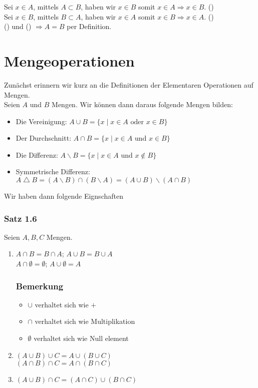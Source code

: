 Sei $x\in A$, mittels $A\subset B$, haben wir $x\in B$ somit $x\in A \Rightarrow x\in B$. (\textasteriskcentered)\\

Sei $x\in B$, mittels $B\subset A$, haben wir $x\in A$ somit $x\in B \Rightarrow x\in A$. (\textasteriskcentered\textasteriskcentered)\\

(\textasteriskcentered) und (\textasteriskcentered\textasteriskcentered) $\Rightarrow A=B$ per Definition. 

\section{Mengeoperationen}
Zunächst erinnern wir kurz an die Definitionen der Elementaren Operationen auf Mengen. \\

\noindent Seien $A$ und $B$ Mengen. Wir können dann daraus folgende Mengen bilden:

\begin{itemize}
\item Die Vereinigung: $A\cup B=\{x\mid x\in A \text{ oder } x\in B\}$
\item Der Durchschnitt: $A\cap B=\{x\mid x\in A \text{ und } x\in B\}$
\item Die Differenz: $A\backslash B=\{x\mid x\in A \text{ und } x\not\in B\}$
\item Symmetrische Differenz: $A\bigtriangleup B=\left(A\backslash B\right) \cap \left(B\backslash A\right)=\left(A\cup B\right)\backslash\left(A\cap B\right)$
\end{itemize}

Wir haben dann folgende Eignschaften
\subsubsection*{Satz 1.6}
Seien $A,B,C$ Mengen. 
\begin{enumerate}
\item $A\cap B=B\cap A$; $A\cup B=B\cup A$\\
$A\cap \emptyset=\emptyset$; $A\cup \emptyset=A$\vspace{-4mm}
\subsubsection*{Bemerkung}
\begin{itemize}
    \item $\cup$ verhaltet sich wie $+$
    \item $\cap$ verhaltet sich wie Multiplikation
    \item $\emptyset$ verhaltet sich wie Null element
\end{itemize}
    \item $\left( A\cup B\right)\cup C=A\cup\left( B\cup C\right)$\\
    $\left( A\cap B\right)\cap C=A\cap\left( B\cap C\right)$
    \item $\left( A\cup B\right) \cap C=\left( A\cap C\right) \cup \left( B\cap C\right)$
\end{enumerate}



